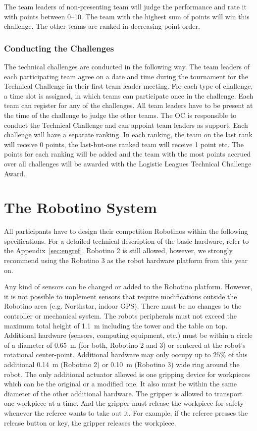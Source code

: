 \documentclass[12pt,twoside]{article}
\begin{document}
The team leaders of non-presenting team will judge the performance and
rate it with points between 0--10.  The team with the highest sum of
points will win this challenge. The other teams are ranked in
decreasing point order.

\subsubsection{Conducting the Challenges~}
The technical challenges are conducted in the following way. The team
leaders of each participating team agree on a date and time during the
tournament for the Technical Challenge in their first team leader
meeting. For each type of challenge, a time slot is assigned, in which
teams can participate once in the challenge. Each team can register
for any of the challenges. All team leaders have to be present at the
time of the challenge to judge the other teams. The OC is responsible
to conduct the Technical Challenge and can appoint team leaders as
support. Each challenge will have a separate ranking. In each ranking,
the team on the last rank will receive 0 points, the last-but-one
ranked team will receive 1 point etc. The points for each ranking will
be added and the team with the most points accrued over all challenges
will be awarded with the Logistic Leagues Technical Challenge Award.


\section{The Robotino System}
\label{sec:robotino}

All participants have to design their competition Robotinos within the
following specifications. For a detailed technical description of the
basic hardware, refer to the Appendix~\ref{sec:engref}. Robotino 2 is
still allowed, however, we strongly recommend using the Robotino 3 as 
the robot hardware platform from this year on.

Any kind of sensors can be changed or added to	 the Robotino platform.
However, it is not possible to implement sensors that require 
modifications outside the Robotino area (e.g. Northstar, indoor GPS).
There must be no changes to the controller or mechanical system.
The robots peripherals must not exceed the maximum total height of 
\SI{1.1}{\metre} including the tower and the table on top. Additional
hardware (sensors, computing equipment, etc.)  must be within a circle 
of a diameter of \SI{0.65}{\metre}  (for both, Robotino 2 and 3) or 
centered at the robot's rotational center-point. Additional hardware 
may only occupy up to $25\%$ of this additional \SI{0.14}{\metre} 
(Robotino 2) or \SI{0.10}{\metre} (Robotino 3) wide ring around the 
robot. The only additional actuator allowed is one gripping device for 
workpieces which can be the original or a modified one. It also must 
be within the same diameter of the other additional hardware. The 
gripper is allowed to transport one workpiece at a time. And the 
gripper must release the workpiece for safety whenever the referee 
wants to take out it. For example, if the referee presses the release 
button or key, the gripper releases the workpiece.
\end{document}
